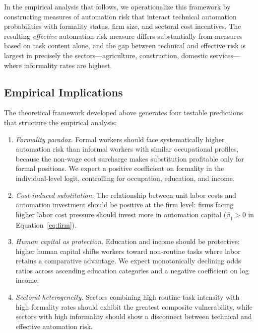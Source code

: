 \documentclass{article}
\begin{document}
In the empirical analysis that follows, we operationalize this framework by constructing measures of automation risk that interact technical automation probabilities with formality status, firm size, and sectoral cost incentives. The resulting \textit{effective} automation risk measure differs substantially from measures based on task content alone, and the gap between technical and effective risk is largest in precisely the sectors---agriculture, construction, domestic services---where informality rates are highest.

\subsection{Empirical Implications}
\label{subsec:empirical_implications}

The theoretical framework developed above generates four testable predictions that structure the empirical analysis:

\begin{enumerate}[label=\textbf{P\arabic*:}]
\item \textit{Formality paradox.} Formal workers should face systematically higher automation risk than informal workers with similar occupational profiles, because the non-wage cost surcharge makes substitution profitable only for formal positions. We expect a positive coefficient on formality in the individual-level logit, controlling for occupation, education, and income.
\item \textit{Cost-induced substitution.} The relationship between unit labor costs and automation investment should be positive at the firm level: firms facing higher labor cost pressure should invest more in automation capital ($\beta_1 > 0$ in Equation~\ref{eq:firm}).
\item \textit{Human capital as protection.} Education and income should be protective: higher human capital shifts workers toward non-routine tasks where labor retains a comparative advantage. We expect monotonically declining odds ratios across ascending education categories and a negative coefficient on log income.
\item \textit{Sectoral heterogeneity.} Sectors combining high routine-task intensity with high formality rates should exhibit the greatest composite vulnerability, while sectors with high informality should show a disconnect between technical and effective automation risk.
\end{enumerate}

\FloatBarrier
\end{document}
